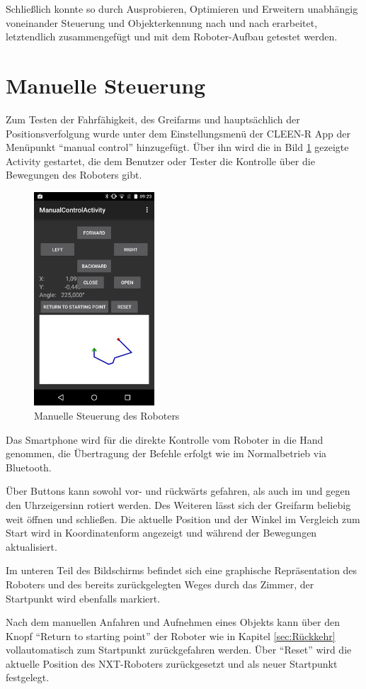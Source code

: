 Schließlich konnte so durch Ausprobieren, Optimieren und Erweitern unabhängig voneinander Steuerung und Objekterkennung nach und nach erarbeitet, letztendlich zusammengefügt und mit dem Roboter-Aufbau getestet werden.

\section{Manuelle Steuerung}

Zum Testen der Fahrfähigkeit, des Greifarms und hauptsächlich der Positionsverfolgung wurde unter dem Einstellungsmenü der CLEEN-R App der Menüpunkt \enquote{manual control} hinzugefügt. Über ihn wird die in Bild \ref{fig:manualControl} gezeigte Activity gestartet, die dem Benutzer oder Tester die Kontrolle über die Bewegungen des Roboters gibt.

\begin{figure}[h]
\centering
\includegraphics[width=0.4\textwidth]{Bilder/Tests/manualControl}
\caption{Manuelle Steuerung des Roboters}
\label{fig:manualControl}
\end{figure}

Das Smartphone wird für die direkte Kontrolle vom Roboter in die Hand genommen, die Übertragung der Befehle erfolgt wie im Normalbetrieb via Bluetooth.

Über Buttons kann sowohl vor- und rückwärts gefahren, als auch im und gegen den Uhrzeigersinn rotiert werden. Des Weiteren lässt sich der Greifarm beliebig weit öffnen und schließen. Die aktuelle Position und der Winkel im Vergleich zum Start wird in Koordinatenform angezeigt und während der Bewegungen aktualisiert.

Im unteren Teil des Bildschirms befindet sich eine graphische Repräsentation des Roboters und des bereits zurückgelegten Weges durch das Zimmer, der Startpunkt wird ebenfalls markiert.

Nach dem manuellen Anfahren und Aufnehmen eines Objekts kann über den Knopf \enquote{Return to starting point} der Roboter wie in Kapitel \ref{sec:Rückkehr} vollautomatisch zum Startpunkt zurückgefahren werden. Über \enquote{Reset} wird die aktuelle Position des NXT-Roboters zurückgesetzt und als neuer Startpunkt festgelegt.
